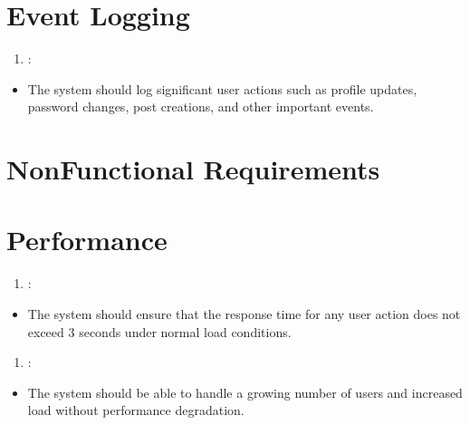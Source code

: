 \documentclass[letterpaper,10pt,english]{sphinxmanual}
\begin{document}
\section{Event Logging}
\label{\detokenize{modules/requirements:event-logging}}\begin{enumerate}
%
\setcounter{enumi}{14}
\item {} 
\sphinxAtStartPar
{}:

\end{enumerate}
\begin{itemize}
\item {} 
\sphinxAtStartPar
The system should log significant user actions such as profile updates, password changes, post creations, and other important events.

\end{itemize}


\section{Non\sphinxhyphen{}Functional Requirements}
\label{\detokenize{modules/requirements:non-functional-requirements}}

\section{Performance}
\label{\detokenize{modules/requirements:performance}}\begin{enumerate}
%
\item {} 
\sphinxAtStartPar
{}:

\end{enumerate}
\begin{itemize}
\item {} 
\sphinxAtStartPar
The system should ensure that the response time for any user action does not exceed 3 seconds under normal load conditions.

\end{itemize}
\begin{enumerate}
%
\setcounter{enumi}{1}
\item {} 
\sphinxAtStartPar
{}:

\end{enumerate}
\begin{itemize}
\item {} 
\sphinxAtStartPar
The system should be able to handle a growing number of users and increased load without performance degradation.

\end{itemize}
\end{document}
